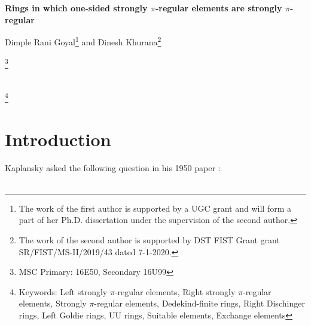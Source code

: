 \documentclass[12pt]{article}
\newcommand\blfootnote[1]{%
	\begingroup
	\renewcommand\thefootnote{}\footnote{#1}%
	\addtocounter{footnote}{-1}%
	\endgroup
}
\theoremstyle{plain}
\theoremstyle{definition}
\begin{document}
	
	
	
	
	\begin{center}
		\Large{\bf Rings in which one-sided strongly $\pi$-regular elements are strongly $\pi$-regular }
		
		\bigskip
		\large{Dimple Rani Goyal\footnote{The work of the first author is supported by a UGC grant and will form a part of her Ph.D. dissertation
				under the supervision of the second author.} and Dinesh Khurana\footnote{The work of the second author is supported by DST FIST Grant grant SR/FIST/MS-II/2019/43 dated 7-1-2020.}}
		
	\end{center}
	
	\vspace{2mm}
	
	
	
	\begin{abstract}
		{\footnotesize In 1977, Hartwig and Luh asked: If $a$ is an element in a Dedekind-finite ring $S$, then does $aS = a^2S$ imply $Sa = Sa^2$? This question was answered negatively by Dittmer, Khurana, and Nielsen in 2014. On the other hand, Dittmer et al.\ proved that the question of Hartwig and Luh has a positive answer for Dedekind-finite exchange rings. We explore the question of Hartwig and Luh for various other classes of Dedekind-finite rings. We will also prove that the condition in question is not left-right symmetric.}
	\end{abstract}
	\blfootnote{MSC Primary: 16E50, Secondary 16U99}\\
	\blfootnote{Keywords: Left strongly $\pi$-regular elements, Right strongly $\pi$-regular elements, Strongly $\pi$-regular elements, Dedekind-finite rings, Right Dischinger rings, Left Goldie rings, UU rings, Suitable elements, Exchange elements}
	
	
	
	\vspace{-5mm}
	
	\section{Introduction}
	 Kaplansky asked the following question in his 1950 paper \cite{KP}:\\
	 
	 \\
	 
\end{document}
